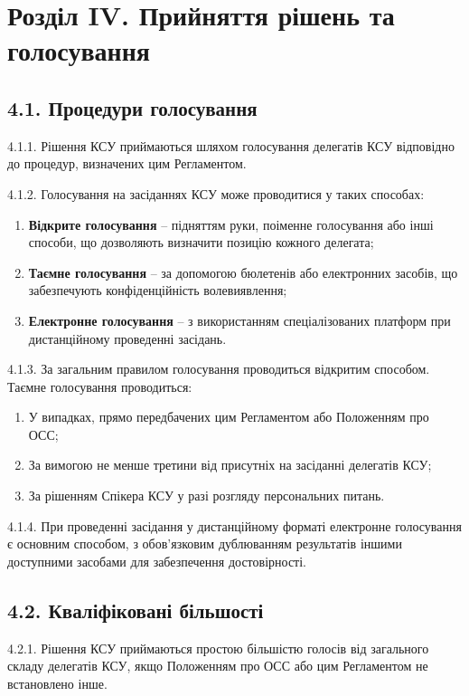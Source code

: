 \section*{Розділ IV. Прийняття рішень та голосування}

\subsection*{4.1. Процедури голосування}
    4.1.1. Рішення КСУ приймаються шляхом голосування делегатів КСУ відповідно до процедур, визначених цим Регламентом.

    4.1.2. Голосування на засіданнях КСУ може проводитися у таких способах:

        \begin{enumerate}[label=\alph*)]
            \item \textbf{Відкрите голосування} -- підняттям руки, поіменне голосування або інші способи, що дозволяють визначити позицію кожного делегата;
            \item \textbf{Таємне голосування} -- за допомогою бюлетенів або електронних засобів, що забезпечують конфіденційність волевиявлення;
            \item \textbf{Електронне голосування} -- з використанням спеціалізованих платформ при дистанційному проведенні засідань.
        \end{enumerate}

    4.1.3. За загальним правилом голосування проводиться відкритим способом. Таємне голосування проводиться:

        \begin{enumerate}[label=\alph*)]
            \item У випадках, прямо передбачених цим Регламентом або Положенням про ОСС;
            \item За вимогою не менше третини від присутніх на засіданні делегатів КСУ;
            \item За рішенням Спікера КСУ у разі розгляду персональних питань.
        \end{enumerate}

    4.1.4. При проведенні засідання у дистанційному форматі електронне голосування є основним способом, з обов'язковим дублюванням результатів іншими доступними засобами для забезпечення достовірності.

\subsection*{4.2. Кваліфіковані більшості}
    4.2.1. Рішення КСУ приймаються простою більшістю голосів від загального складу делегатів КСУ, якщо Положенням про ОСС або цим Регламентом не встановлено інше.

